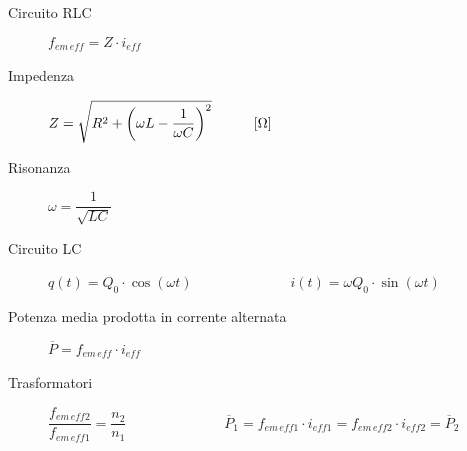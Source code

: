 \documentclass[a4paper,11pt,italian]{article}
\begin{document}
\begin{description}
  \item[Circuito RLC] $ f_{em \, \mathit{eff}} = Z \cdot i_{\mathit{eff}} $
  \item[Impedenza] $  Z = \sqrt{R^2 + \left( \omega L - \dfrac{1}{\omega C} \right)^2} \hspace*{3em} [\Omega] $

  
  \item[Risonanza] 
  $ \omega = \dfrac{1}{\sqrt{LC}} $

  \item[Circuito LC] $ q(t) = Q_0 \cdot \cos (\omega t) $~~~~~~~~~~~~~~$ i(t) = \omega Q_0 \cdot \sin (\omega t) $
  

  \item[Potenza media prodotta in corrente alternata] 
  $ \overline{P} = f_{em \, \mathit{eff}} \cdot i_{\mathit{eff}} $
  
  \item[Trasformatori] $ \dfrac{f_{em \, \mathit{eff}2}}{f_{em \, \mathit{eff}1}} = \dfrac{n_2}{n_1} $~~~~~~~~~~~~~~$ \overline{P}_1 = f_{em \, \mathit{eff}1} \cdot i_{\mathit{eff}1} =  f_{em \, \mathit{eff}2} \cdot i_{\mathit{eff}2} = \overline{P}_2 $
\end{description}
\end{document}
